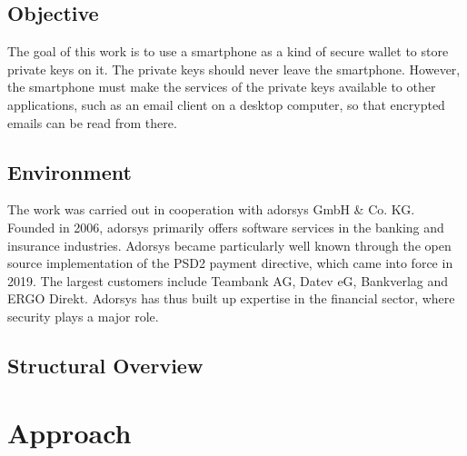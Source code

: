 \documentclass[12pt,oneside,a4paper,parskip]{scrbook}
\begin{document}


\section{Objective}

The goal of this work is to use a smartphone as a kind of secure wallet to store private keys on it. The private keys should never leave the smartphone. However, the smartphone must make the services of the private keys available to other applications, such as an email client on a desktop computer, so that encrypted emails can be read from there.

\section{Environment}

The work was carried out in cooperation with adorsys GmbH \& Co. KG. Founded in 2006, adorsys primarily offers software services in the banking and insurance industries. Adorsys became particularly well known through the open source implementation of the PSD2 payment directive, which came into force in 2019. The largest customers include Teambank AG, Datev eG, Bankverlag and ERGO Direkt. Adorsys has thus built up expertise in the financial sector, where security plays a major role. 

\section{Structural Overview}


\chapter{Approach}

\end{document}
